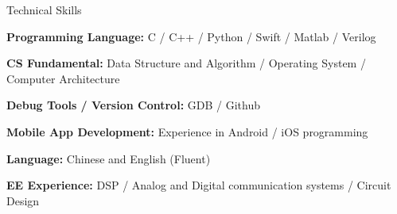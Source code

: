\documentclass[letterpaper]{resume} %
\begin{document}
\begin{rSection}{Technical Skills}

\begin{rSubsection}{}{}{}{}
\vspace{-0.6\baselineskip}
\item {\bfseries{Programming Language:}} C / C++ / Python / Swift / Matlab / Verilog
\item {\bfseries{CS Fundamental:}} Data Structure and Algorithm / Operating System / Computer Architecture
\item {\bfseries{Debug Tools / Version Control:}} GDB / Github 
\item {\bfseries{Mobile App Development:}} Experience in Android / iOS programming
\item {\bfseries{Language:}} Chinese and English (Fluent)
\item {\bfseries{EE Experience:}} DSP / Analog and Digital communication systems / Circuit Design
\end{rSubsection}

\end{rSection}
\vspace{-0.6\baselineskip}

\end{document}
